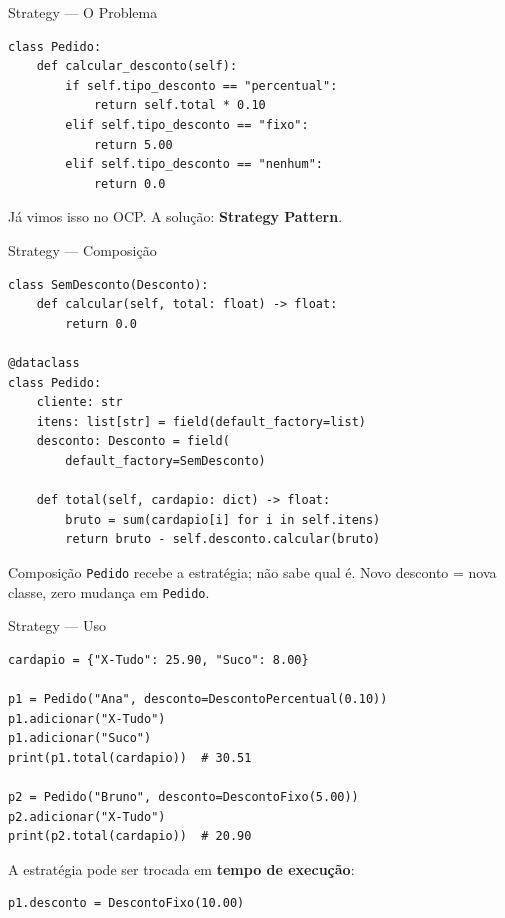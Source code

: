 \documentclass[aspectratio=169]{beamer}
\begin{document}
\begin{frame}[fragile]{Strategy --- O Problema}
\begin{lstlisting}
class Pedido:
    def calcular_desconto(self):
        if self.tipo_desconto == "percentual":
            return self.total * 0.10
        elif self.tipo_desconto == "fixo":
            return 5.00
        elif self.tipo_desconto == "nenhum":
            return 0.0
\end{lstlisting}

Já vimos isso no OCP. A solução: \textbf{Strategy Pattern}.
\end{frame}

\begin{frame}{Strategy --- Composição}
\begin{lstlisting}
class SemDesconto(Desconto):
    def calcular(self, total: float) -> float:
        return 0.0

@dataclass
class Pedido:
    cliente: str
    itens: list[str] = field(default_factory=list)
    desconto: Desconto = field(
        default_factory=SemDesconto)

    def total(self, cardapio: dict) -> float:
        bruto = sum(cardapio[i] for i in self.itens)
        return bruto - self.desconto.calcular(bruto)
\end{lstlisting}

\begin{exampleblock}{Composição}
\texttt{Pedido} recebe a estratégia; não sabe qual é. Novo desconto = nova classe, zero mudança em \texttt{Pedido}.
\end{exampleblock}
\end{frame}

\begin{frame}[fragile]{Strategy --- Uso}
\begin{lstlisting}
cardapio = {"X-Tudo": 25.90, "Suco": 8.00}

p1 = Pedido("Ana", desconto=DescontoPercentual(0.10))
p1.adicionar("X-Tudo")
p1.adicionar("Suco")
print(p1.total(cardapio))  # 30.51

p2 = Pedido("Bruno", desconto=DescontoFixo(5.00))
p2.adicionar("X-Tudo")
print(p2.total(cardapio))  # 20.90
\end{lstlisting}

A estratégia pode ser trocada em \textbf{tempo de execução}:
\begin{lstlisting}
p1.desconto = DescontoFixo(10.00)
\end{lstlisting}
\end{frame}
\end{document}
